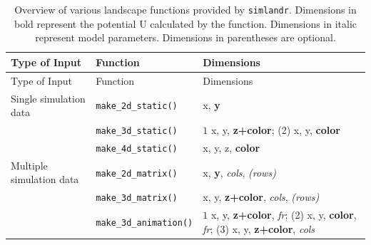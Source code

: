 \begin{longtable}[]{@{}
  >{\raggedright\arraybackslash}p{}
  >{\raggedright\arraybackslash}p{}
  >{\raggedright\arraybackslash}p{}@{}}
\caption{\label{tab:overview} Overview of various landscape functions provided by \texttt{simlandr}. Dimensions in bold represent the potential U calculated by the function. Dimensions in italic represent model parameters. Dimensions in parentheses are optional.}\tabularnewline
\toprule\noalign{}
\begin{minipage}[b]{\linewidth}\raggedright
Type of Input
\end{minipage} & \begin{minipage}[b]{\linewidth}\raggedright
Function
\end{minipage} & \begin{minipage}[b]{\linewidth}\raggedright
Dimensions
\end{minipage} \\
\midrule\noalign{}
\endfirsthead
\toprule\noalign{}
\begin{minipage}[b]{\linewidth}\raggedright
Type of Input
\end{minipage} & \begin{minipage}[b]{\linewidth}\raggedright
Function
\end{minipage} & \begin{minipage}[b]{\linewidth}\raggedright
Dimensions
\end{minipage} \\
\midrule\noalign{}
\endhead
\bottomrule\noalign{}
\endlastfoot
Single simulation data & \texttt{make\_2d\_static()} & x, \textbf{y} \\
& \texttt{make\_3d\_static()} & \(1\) x, y, \textbf{z+color}; (2) x, y, \textbf{color} \\
& \texttt{make\_4d\_static()} & x, y, z, \textbf{color} \\
Multiple simulation data & \texttt{make\_2d\_matrix()} & x, \textbf{y}, \emph{cols}, \emph{(rows)} \\
& \texttt{make\_3d\_matrix()} & x, y, \textbf{z+color}, \emph{cols}, \emph{(rows)} \\
& \texttt{make\_3d\_animation()} & \(1\) x, y, \textbf{z+color}, \emph{fr}; (2) x, y, \textbf{color}, \emph{fr}; (3) x, y, \textbf{z+color}, \emph{cols} \\
\end{longtable}

